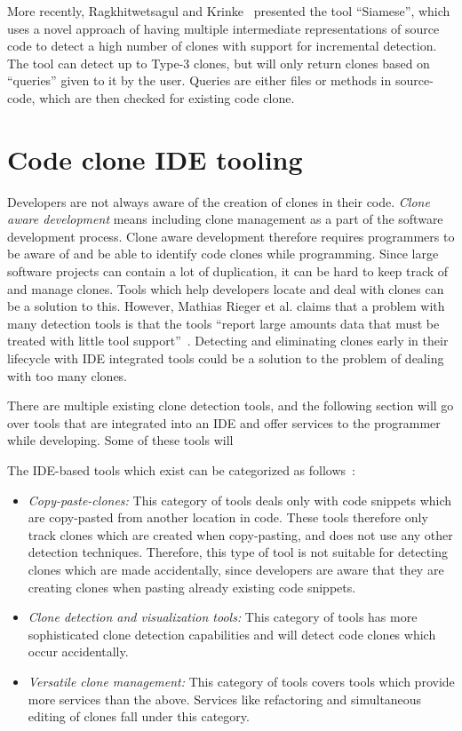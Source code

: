 More recently, Ragkhitwetsagul and Krinke~\cite{SiameseScalableAndIncrementalClone}
presented the tool ``Siamese'', which uses a novel approach of having multiple
intermediate representations of source code to detect a high number of clones with support
for incremental detection. The tool can detect up to Type-3 clones, but will only return
clones based on ``queries'' given to it by the user. Queries are either files or methods
in source-code, which are then checked for existing code clone.



\section{Code clone IDE tooling}


Developers are not always aware of the creation of clones in their code. \emph{Clone aware
development} means including clone management as a part of the software development
process. Clone aware development therefore requires programmers to be aware of and be able
to identify code clones while programming. Since large software projects can contain a lot
of duplication, it can be hard to keep track of and manage clones. Tools which help
developers locate and deal with clones can be a solution to this. However, Mathias Rieger
et al. claims that a problem with many detection tools is that the tools ``report large
amounts data that must be treated with little tool
support''~\cite[1]{InsightsSystemWideDuplication}. Detecting and eliminating clones early
in their lifecycle with IDE integrated tools could be a solution to the problem of dealing
with too many clones.

There are multiple existing clone detection tools, and the following section will go over
tools that are integrated into an IDE and offer services to the programmer while developing. Some
of these tools will 

The IDE-based tools which exist can be categorized as
follows~\cite[8]{Udding_Towards_Convenient_Management}:

\begin{itemize}
	\item\textit{Copy-paste-clones:} This category of tools deals only with code snippets which are
	copy-pasted from another location in code. These tools therefore only track clones which
	are created when copy-pasting, and does not use any other detection techniques. Therefore,
	this type of tool is not suitable for detecting clones which are made accidentally, since
	developers are aware that they are creating clones when pasting already existing code
	snippets.

	\item\textit{Clone detection and visualization tools:} This category of tools has more
	sophisticated clone detection capabilities and will detect code clones which occur
	accidentally.

	\item\textit{Versatile clone management:} This category of tools covers tools which provide more
	services than the above. Services like refactoring and simultaneous editing of clones fall
	under this category.
\end{itemize}

